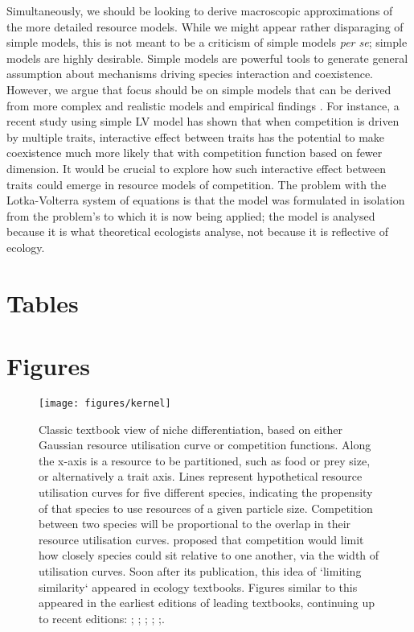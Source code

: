 \documentclass[a4paper,11pt]{article}
\begin{document}
{Simultaneously, we should be looking to derive macroscopic approximations of the more detailed resource models.
While we might appear rather disparaging of simple models, this is not meant to be a criticism of simple models \textit{per se}; simple models are highly desirable.
Simple models are powerful tools to generate general assumption about mechanisms driving species interaction and coexistence. However, we argue that focus should be on simple models that can be derived from more complex and realistic models and empirical findings \citep[e.g.][]{Champagnat-2006}. For instance, a recent study \citep{Doebeli-2010} using simple LV model has shown that when competition is driven by multiple traits, interactive effect between traits has the potential to make coexistence much more likely that with competition function based on fewer dimension. It would be crucial to explore how such interactive effect between traits could emerge in resource models of competition.
The problem with the Lotka-Volterra system of equations is that the model was formulated in isolation from the problem's to which it is now being applied; the model is analysed because it is what theoretical ecologists analyse, not because it is reflective of ecology.


\clearpage

\section{Tables}



\clearpage

\section{Figures}

\begin{figure}[h]
  \centering
  \texttt{[image: figures/kernel]}
  \caption{Classic textbook view of niche differentiation, based on either Gaussian resource utilisation curve or competition functions. Along the x-axis is a resource to be partitioned, such as food or prey size, or alternatively a trait axis.  Lines represent hypothetical resource utilisation curves for five different species, indicating the propensity of that species to use resources of a given particle size. Competition between two species will be proportional to the overlap in their resource utilisation curves. \citet{MacArthur-1967} proposed that competition would limit how closely species could sit relative to one another, via the width of utilisation curves. Soon after its publication, this idea of `limiting similarity` appeared in ecology textbooks. Figures similar to this appeared in the earliest editions of leading textbooks, continuing up to recent editions: \citet[Fig. 7.9]{Begon-1986}; \citet[Fig. 8.29]{Begon-2006}; \citet[Fig. 12.20]{Krebs-1978}; \citet[????]{ Krebs-2013}; \citet[Fig. 36.13]{Ricklefs-1973};\citet[Fig. 29.19]{Ricklefs-1999}.} 
  \label{fig:competition-functions}
\end{figure}

}
\end{document}
